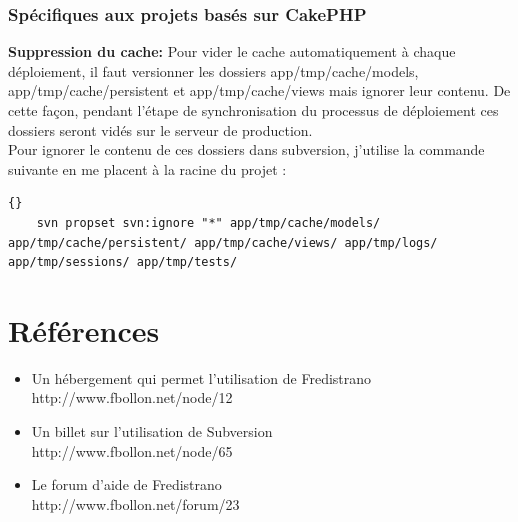 \documentclass[12pt,a4paper]{report}
\begin{document}
\subsection{Spécifiques aux projets basés sur CakePHP} %
\begin{list}{-}{}
	\item \textbf{Suppression du cache:} Pour vider le cache automatiquement à chaque déploiement, il faut versionner les dossiers app/tmp/cache/models, app/tmp/cache/persistent et app/tmp/cache/views mais ignorer leur contenu. De cette façon, pendant l'étape de synchronisation du processus de déploiement ces dossiers seront vidés sur le serveur de production.\\
	Pour ignorer le contenu de ces dossiers dans subversion, j'utilise la commande suivante en me placent à la racine du projet :
	\lstset{language=bash}
	\lstset{breaklines=true}
	\lstset{tabsize=1}
	\begin{lstlisting}[frame=tb]{}
	svn propset svn:ignore "*" app/tmp/cache/models/ app/tmp/cache/persistent/ app/tmp/cache/views/ app/tmp/logs/ app/tmp/sessions/ app/tmp/tests/
	\end{lstlisting}
\end{list}

\chapter{Références}
\begin{itemize}
\item Un hébergement qui permet l'utilisation de Fredistrano \\ http://www.fbollon.net/node/12 \\
\item Un billet sur l'utilisation de Subversion \\ http://www.fbollon.net/node/65 \\
\item Le forum d'aide de Fredistrano \\ http://www.fbollon.net/forum/23
\end{itemize}
\end{document}
